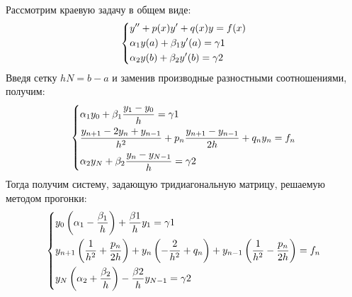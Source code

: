 \documentclass[11pt]{article}
\begin{document}
 Рассмотрим краевую задачу в общем виде:
 \[
\begin{dcases} 
   y'' + p(x)y' + q(x)y = f(x) \\
   \alpha_1 y(a) + \beta_1 y'(a) = \gamma1 \\
   \alpha_2 y(b) + \beta_2 y'(b) = \gamma2 \\
\end{dcases}
\]
Введя сетку $hN = b - a$ и заменив производные разностными соотношениями, получим:
\[
 \begin{dcases}
  \alpha_1 y_0 + \beta_1 \frac{y_1 - y_0}{h} = \gamma1 \\
  \frac{y_{n+1} - 2y_n + y_{n-1}}{h^2} + p_n\frac{y_{n+1} - y_{n-1}}{2h} + q_ny_n = f_n \\
  \alpha_2 y_N + \beta_2 \frac{y_n - y_{N-1}}{h} = \gamma2 \\
 \end{dcases}
\]
Тогда получим систему, задающую тридиагональную матрицу, решаемую методом прогонки:
\[
 \begin{dcases}
  y_0\left(\alpha_1 - \frac{\beta_1}{h}\right) + \frac{\beta1}{h}y_1 = \gamma1 \\
  y_{n+1} \left(\frac{1}{h^2} + \frac{p_n}{2h}\right) + y_n\left(-\frac{2}{h^2} + q_n\right) + y_{n-1}\left(\frac{1}{h^2} - \frac{p_n}{2h}\right) = f_n\\
  y_{N}\left(\alpha_2 + \frac{\beta_2}{h}\right) - \frac{\beta2}{h}y_{N-1} = \gamma2 \\
 \end{dcases}
\]
\end{document}
